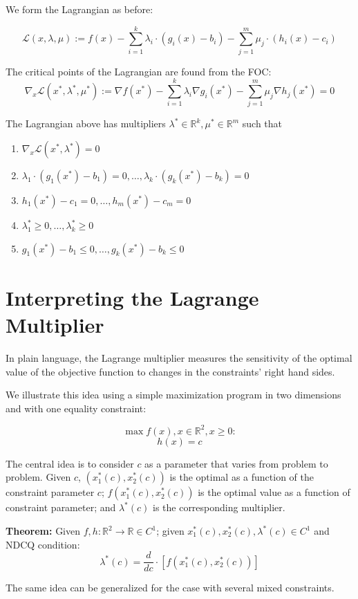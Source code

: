 \documentclass[11pt,]{article}
\providecommand{\tightlist}{%
  \setlength{\itemsep}{0pt}\setlength{\parskip}{0pt}}
\begin{document}
We form the Lagrangian as before:

\[
\mathcal{L}(x,\lambda,\mu) := f(x)-\sum_{i=1}^k \lambda_i\cdot(g_i(x)-b_i)-
\sum_{j=1}^m \mu_j\cdot(h_i(x)-c_i)
\]

The critical points of the Lagrangian are found from the FOC: \[
\nabla_x\mathcal{L}(x^*,\lambda^*,\mu^*) := \nabla f(x^*)-
\sum_{i=1}^k\lambda_i\nabla g_i(x^*) -
\sum_{j=1}^m\mu_j\nabla h_j(x^*)=0
\]

The Lagrangian above has multipliers
\(\lambda^*\in \mathbb{R}^k, \mu^*\in \mathbb{R}^m\) such that

\begin{enumerate}
\def\labelenumi{\arabic{enumi}.}
\tightlist
\item
  \(\nabla_x\mathcal{L}(x^*,\lambda^*)=0\)
\item
  \(\lambda_1\cdot(g_1(x^*)-b_1)=0,\hdots,\lambda_k\cdot(g_k(x^*)-b_k)=0\)
\item
  \(h_1(x^*)-c_1=0,\hdots,h_m(x^*)-c_m=0\)
\item
  \(\lambda_1^*\geq 0,\hdots,\lambda_k^*\geq 0\)
\item
  \(g_1(x^*)-b_1\leq 0,\hdots,g_k(x^*)-b_k\leq 0\)
\end{enumerate}

\section{Interpreting the Lagrange
Multiplier}\label{interpreting-the-lagrange-multiplier}

In plain language, the Lagrange multiplier measures the sensitivity of
the optimal value of the objective function to changes in the
constraints' right hand sides.

We illustrate this idea using a simple maximization program in two
dimensions and with one equality constraint:

\[\max f(x),x\in \mathbb{R}^2,x\geq 0:\] \[h(x)=c\]

The central idea is to consider \(c\) as a parameter that varies from
problem to problem. Given \(c\), \((x_1^*(c),x_2^*(c))\) is the optimal
as a function of the constraint parameter \(c\);
\(f(x_1^*(c),x_2^*(c))\) is the optimal value as a function of
constraint parameter; and \(\lambda^*(c)\) is the corresponding
multiplier.

\textbf{Theorem:} Given \(f,h:\mathbb{R}^2\to \mathbb{R}\in C^1\); given
\(x_1^*(c),x_2^*(c),\lambda^*(c)\in C^1\) and NDCQ condition:
\[\lambda^*(c)=\frac{d}{dc}\cdot [f(x_1^*(c),x_2^*(c))]\]

The same idea can be generalized for the case with several mixed
constraints.
\end{document}
